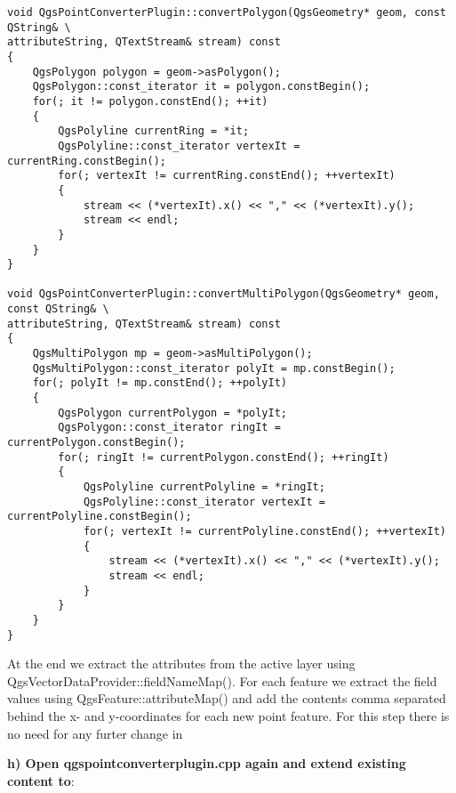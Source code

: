 \begin{verbatim}
void QgsPointConverterPlugin::convertPolygon(QgsGeometry* geom, const QString& \
attributeString, QTextStream& stream) const
{
    QgsPolygon polygon = geom->asPolygon();
    QgsPolygon::const_iterator it = polygon.constBegin();
    for(; it != polygon.constEnd(); ++it)
    {
        QgsPolyline currentRing = *it;
        QgsPolyline::const_iterator vertexIt = currentRing.constBegin();
        for(; vertexIt != currentRing.constEnd(); ++vertexIt)
        {
            stream << (*vertexIt).x() << "," << (*vertexIt).y();
            stream << endl;
        }
    }
}

void QgsPointConverterPlugin::convertMultiPolygon(QgsGeometry* geom, const QString& \
attributeString, QTextStream& stream) const
{
    QgsMultiPolygon mp = geom->asMultiPolygon();
    QgsMultiPolygon::const_iterator polyIt = mp.constBegin();
    for(; polyIt != mp.constEnd(); ++polyIt)
    {
        QgsPolygon currentPolygon = *polyIt;
        QgsPolygon::const_iterator ringIt = currentPolygon.constBegin();
        for(; ringIt != currentPolygon.constEnd(); ++ringIt)
        {
            QgsPolyline currentPolyline = *ringIt;
            QgsPolyline::const_iterator vertexIt = currentPolyline.constBegin();
            for(; vertexIt != currentPolyline.constEnd(); ++vertexIt)
            {
                stream << (*vertexIt).x() << "," << (*vertexIt).y();
                stream << endl;
            }
        }
    }
}
\end{verbatim}


At the end we extract the attributes from the active layer using
QgsVectorDataProvider::fieldNameMap(). For each feature we extract the field
values using QgsFeature::attributeMap() and add the contents comma separated
behind the x- and y-coordinates for each new point feature. For this step
there is no need for any furter change in  

\textbf{h) Open qgspointconverterplugin.cpp again and extend existing content
to}:

